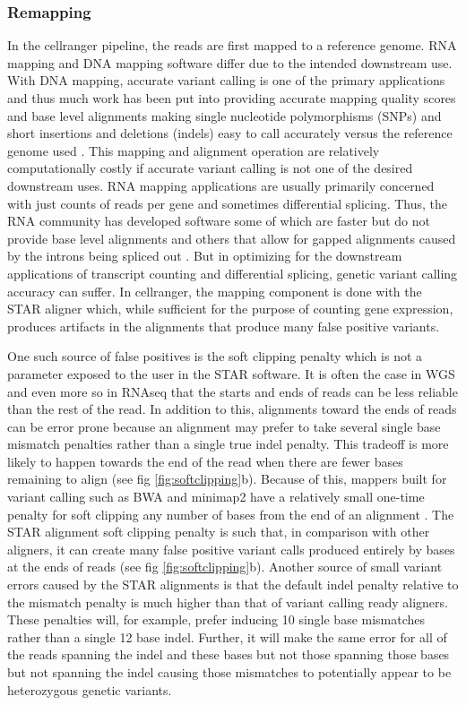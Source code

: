\subsubsection{Remapping}
In the cellranger pipeline, the reads are first mapped to a reference genome. RNA mapping and DNA mapping software differ due to the intended downstream use. With DNA mapping, accurate variant calling is one of the primary applications and thus much work has been put into providing accurate mapping quality scores and base level alignments making single nucleotide polymorphisms (SNPs) and short insertions and deletions (indels) easy to call accurately versus the reference genome used \cite{bwa}\cite{minimap2}\cite{bowtie}\cite{freebayes}\cite{gatk}. This mapping and alignment operation are relatively computationally costly if accurate variant calling is not one of the desired downstream uses. RNA mapping applications are usually primarily concerned with just counts of reads per gene and sometimes differential splicing. Thus, the RNA community has developed software some of which are faster but do not provide base level alignments \cite{kallisto}\cite{salmon} and others that allow for gapped alignments caused by the introns being spliced out \cite{bowtie2}\cite{STAR}\cite{hisat}\cite{tophat}. But in optimizing for the downstream applications of transcript counting and differential splicing, genetic variant calling accuracy can suffer. In cellranger, the mapping component is done with the STAR aligner \cite{STAR} which, while sufficient for the purpose 
of counting gene expression, produces artifacts in the alignments that produce many false positive variants. 

One such source of false positives is the 
soft clipping penalty which is not a parameter exposed to the user in the STAR software. It is often the case in WGS and even more so in RNAseq that the starts and ends of
reads can be less reliable than the rest of the read. In addition to this, alignments toward the ends of reads can be error prone because an alignment may prefer to take several single base mismatch penalties rather than a single true indel penalty. This tradeoff is more likely to happen towards the end of the read when there are fewer bases remaining to align (see fig \ref{fig:softclipping}b). Because of this, mappers built for variant calling such as BWA \cite{bwa} and minimap2 \cite{minimap2} have 
a relatively small one-time penalty for soft clipping any number of bases from the end of an alignment \cite{variantartifacts}. The STAR alignment soft clipping penalty is such that, in 
comparison with other aligners, it can create many false positive variant calls produced entirely by bases at the ends of reads (see fig \ref{fig:softclipping}b). Another source of 
small variant errors caused by the STAR alignments is that the default indel penalty relative to the mismatch penalty is much higher than that of 
variant calling ready aligners. These penalties will, for example, prefer inducing 10 single base mismatches rather than a single 12 base indel. Further, it will make the same error for all of the reads spanning the indel and these bases but not those spanning those bases but not spanning the indel causing those mismatches to potentially appear to be heterozygous genetic variants. 


